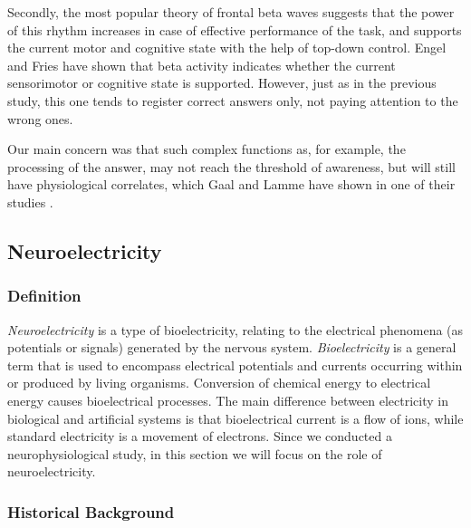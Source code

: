 \documentclass[14pt,a4paper]{scrartcl}
\begin{document}
Secondly, the most popular theory of frontal beta waves suggests that the power of this rhythm increases in case of effective performance of the task, and supports the current motor and cognitive state with the help of top-down control. Engel and Fries \cite{Engel2010} have shown that beta activity indicates whether the current sensorimotor or cognitive state is supported. However, just as in the previous study, this one tends to register correct answers only, not paying attention to the wrong ones.

Our main concern was that such complex functions as, for example, the processing of the answer, may not reach the threshold of awareness, but will still have physiological correlates, which Gaal and Lamme have shown in one of their studies \cite{VanGaal2012}.

\subsection{Neuroelectricity}
\label{sec:Hypothesis:Bioelectricity}

\subsubsection{Definition}
\label{sec:Hypothesis:Bioelectricity:Definition}

\textit{Neuroelectricity} is a type of bioelectricity, relating to the electrical phenomena (as potentials or signals) generated by the nervous system. \textit{Bioelectricity} is a general term that is used to encompass electrical potentials and currents occurring within or produced by living organisms. Conversion of chemical energy to electrical energy causes bioelectrical processes. The main difference between electricity in biological and artificial systems is that bioelectrical current is a flow of ions, while standard electricity is a movement of electrons. Since we conducted a neurophysiological study, in this section we will focus on the role of neuroelectricity.

\subsubsection{Historical Background}
\label{sec:Hypothesis:Bioelectricity:Historical Background}
\end{document}

